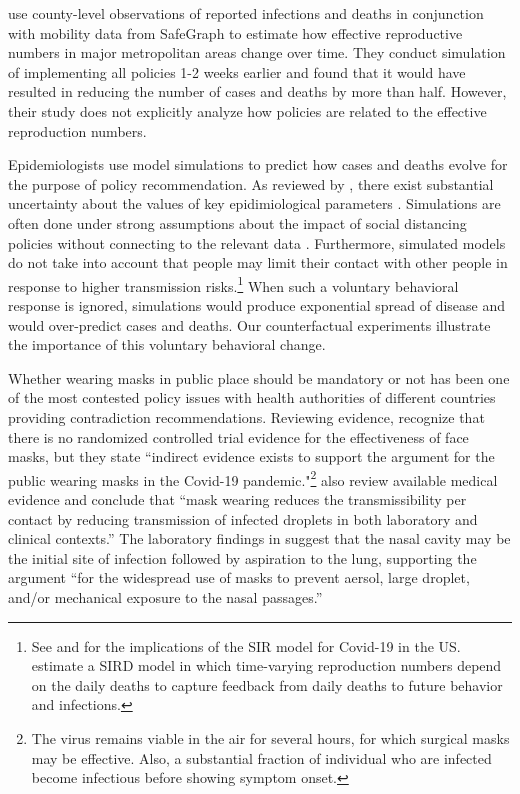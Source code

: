 \documentclass[11pt,reqno,letter]{amsart}
\theoremstyle{definition}
\begin{document}
 \cite{pei2020} use county-level observations of reported infections and deaths in conjunction with mobility  data from SafeGraph to estimate how effective reproductive numbers in major metropolitan areas change over time. They conduct simulation of implementing all policies 1-2 weeks earlier and found that it would have resulted in reducing the number of cases and deaths by more than half. However, their study does not  explicitly analyze how policies are related to
the effective reproduction numbers. %

Epidemiologists use model simulations to predict how cases and deaths evolve for the purpose of policy recommendation. As reviewed by \cite{avery2020policy}, there exist substantial uncertainty about the values of key epidimiological parameters \citep[see also][]{atkeson2020b,stock2020}. Simulations are often done under strong assumptions about the impact of social distancing policies without connecting to the relevant data  \citep[e.g.,][]{ferguson2020}. Furthermore, simulated models do not take into account that people may limit their contact with other people in response to higher transmission risks.\footnote{See \cite{atkeson2020a} and \cite{stock2020} for the implications of the SIR model for Covid-19 in the US. \cite{NBERw27128} estimate a SIRD model in which time-varying reproduction numbers depend on the daily deaths to capture feedback from daily deaths
to future behavior and infections.}  When such a voluntary behavioral response is ignored, simulations would produce exponential spread of disease and would over-predict  cases and deaths. Our counterfactual experiments  illustrate the importance of this voluntary behavioral change.




Whether wearing  masks in public place should be mandatory or not has been one of the most contested policy issues with health authorities of different countries providing contradiction recommendations. Reviewing evidence, \cite{Greenhalghm2020}  recognize that there is no randomized controlled trial evidence for the effectiveness of face masks,  but they state ``indirect evidence exists to support the argument for the public wearing masks in the Covid-19 pandemic."\footnote{The virus remains viable in the air for several hours, for which surgical masks may be effective. Also, a substantial fraction of individual who are infected become infectious before showing symptom onset.}
\cite{howard2020} also review available medical evidence and conclude that ``mask wearing reduces the transmissibility per contact by reducing transmission of infected droplets in both laboratory and clinical contexts.''  The laboratory findings in \cite{hou2020} suggest that the nasal cavity may be the initial site of infection followed by aspiration to the lung, supporting the argument  ``for the widespread use of masks to prevent aersol, large droplet, and/or mechanical exposure to the nasal passages.''
\end{document}
